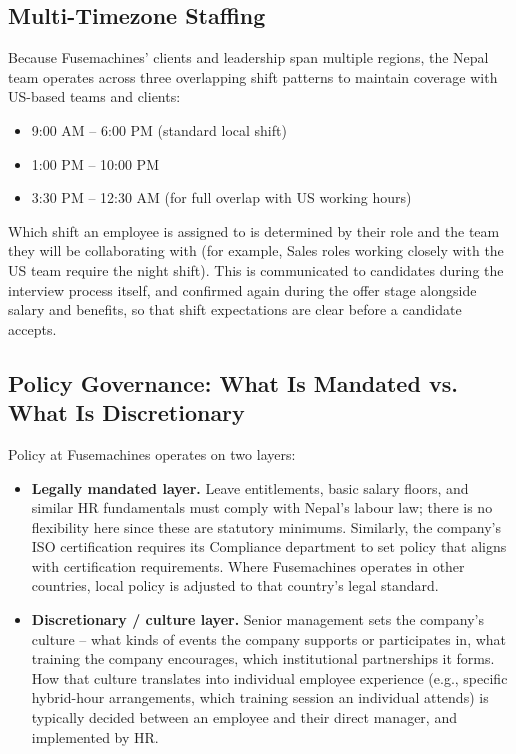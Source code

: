\documentclass[12pt,a4paper]{report}
\begin{document}
\subsection*{Multi-Timezone Staffing}
Because Fusemachines' clients and leadership span multiple regions, the Nepal team operates across three overlapping shift patterns to maintain coverage with US-based teams and clients:
\begin{itemize}[leftmargin=1.5cm]
  \item 9:00 AM -- 6:00 PM (standard local shift)
  \item 1:00 PM -- 10:00 PM
  \item 3:30 PM -- 12:30 AM (for full overlap with US working hours)
\end{itemize}
Which shift an employee is assigned to is determined by their role and the team they will be collaborating with (for example, Sales roles working closely with the US team require the night shift). This is communicated to candidates during the interview process itself, and confirmed again during the offer stage alongside salary and benefits, so that shift expectations are clear before a candidate accepts.

\subsection*{Policy Governance: What Is Mandated vs. What Is Discretionary}
Policy at Fusemachines operates on two layers:
\begin{itemize}[leftmargin=1.5cm]
  \item \textbf{Legally mandated layer.} Leave entitlements, basic salary floors, and similar HR fundamentals must comply with Nepal's labour law; there is no flexibility here since these are statutory minimums. Similarly, the company's ISO certification requires its Compliance department to set policy that aligns with certification requirements. Where Fusemachines operates in other countries, local policy is adjusted to that country's legal standard.
  \item \textbf{Discretionary / culture layer.} Senior management sets the company's culture -- what kinds of events the company supports or participates in, what training the company encourages, which institutional partnerships it forms. How that culture translates into individual employee experience (e.g., specific hybrid-hour arrangements, which training session an individual attends) is typically decided between an employee and their direct manager, and implemented by HR.
\end{itemize}
\end{document}
